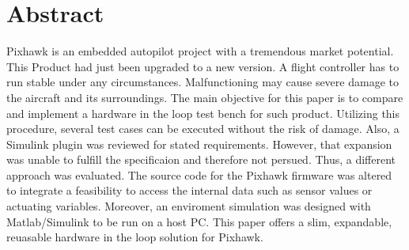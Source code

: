 \section*{Abstract}

Pixhawk is an embedded autopilot project with a tremendous market potential. This Product had just been upgraded to a new version. A flight controller has to run stable under any circumstances. Malfunctioning may cause severe damage to the aircraft and its surroundings. The main objective for this paper is to compare and implement a hardware in the loop test bench for such product. Utilizing this procedure, several test cases can be executed without the risk of damage. Also, a Simulink plugin was reviewed for stated requirements. However, that  expansion was unable to fulfill the specificaion and therefore not persued. Thus, a different approach was  evaluated. The source code for the Pixhawk firmware was altered to integrate a feasibility to access the internal data such as sensor values or actuating variables. Moreover, an enviroment simulation was designed with Matlab/Simulink to be run on a host PC. This paper offers a slim, expandable, reuasable hardware in the loop solution for Pixhawk. 

\clearpage